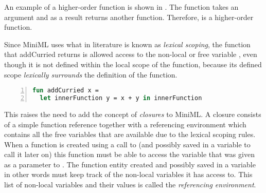 \documentclass[10pt,a4paper,master=cws, masteroption=ai,english,inputenc=utf8]{kulemt}
\begin{document}
\smallskip
An example of a higher-order function is shown in . 
The function  takes an argument  and as a result returns another function.
Therefore,  is a higher-order function.

Since \mbox{MiniML} uses what in literature is known as \emph{lexical scoping}, the function that addCurried returns is allowed access to the non-local or free variable , even though it is not defined within the local scope of the function, because its defined scope \emph{lexically surrounds} the definition of the function.


\begin{lstlisting}[frame=single, language=ML,caption=The use of lexical scoping calls for closures., label=code:LexicalScopingExample,numbers=left]
fun addCurried x = 
  let innerFunction y = x + y in innerFunction
\end{lstlisting}
\label{code:LexicalScopingExample}

%


This raises the need to add the concept of \emph{closures} to \mbox{MiniML}.
A closure consists of a simple function reference together with a referencing environment which contains all the free variables that are available due to the lexical scoping rules.
When a function is created using a call to  (and possibly saved in a variable to call it later on) this function must be able to access the variable  that was given as a parameter to .
The function entity created and possibly saved in a variable in other words must keep track of the non-local variables it has access to.
This list of non-local variables and their values is called the \emph{referencing environment}.
\end{document}
